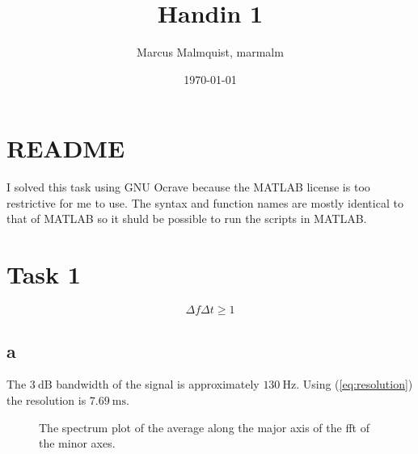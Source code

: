 \documentclass[12pt,a4paper]{article}
\title{Handin 1}
\author{Marcus Malmquist, marmalm}
\date{\today}
\begin{document}
\maketitle

\section{README}
I solved this task using GNU Ocrave because the MATLAB license is too restrictive for me to use. The syntax and function names are mostly identical to that of MATLAB so it shuld be possible to run the scripts in MATLAB.

\section{Task 1}\label{sec:1}
\begin{equation}
  \label{eq:resolution}
  \Delta f \Delta t \geq 1
\end{equation}
\subsection{a}
The $\SI{3}{\deci\bel}$ bandwidth of the signal is approximately $\SI{130}{\hertz}$. Using (\ref{eq:resolution}) the resolution is $\SI{7.69}{\milli\second}$.

\begin{figure}[h]
  \centering
  \noindent\makebox[\textwidth]{\scalebox{0.90}{}}
  \caption{The spectrum plot of the average along the major axis of the fft of the minor axes.}
  \label{fig:task1_ut}
\end{figure}
\end{document}

